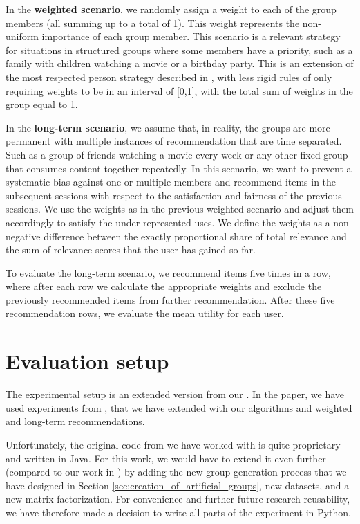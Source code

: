 In the \textbf{weighted scenario}, we randomly assign a weight to each of the group members (all summing up to a total of 1). This weight represents the non-uniform importance of each group member. This scenario is a relevant strategy for situations in structured groups where some members have a priority, such as a family with children watching a movie or a birthday party. This is an extension of the most respected person strategy described in \cite{most_respected_person}, with less rigid rules of only requiring weights to be in an interval of [0,1], with the total sum of weights in the group equal to 1.

In the \textbf{long-term scenario}, we assume that, in reality, the groups are more permanent with multiple instances of recommendation that are time separated. Such as a group of friends watching a movie every week or any other fixed group that consumes content together repeatedly. In this scenario, we want to prevent a systematic bias against one or multiple members and recommend items in the subsequent sessions with respect to the satisfaction and fairness of the previous sessions. We use the weights as in the previous weighted scenario and adjust them accordingly to satisfy the under-represented uses. We define the weights as a non-negative difference between the exactly proportional share of total relevance and the sum of relevance scores that the user has gained so far.

To evaluate the long-term scenario, we recommend items five times in a row, where after each row we calculate the appropriate weights and exclude the previously recommended items from further recommendation. After these five recommendation rows, we evaluate the mean utility for each user.


\section{Evaluation setup} \label{sec:07_experiments.evaluation_setup}
The experimental setup is an extended version from our \cite{our_ep_fuzz_da}. In the paper, we have used experiments from \cite{GFAR-kaya2020}, that we have extended with our algorithms and weighted and long-term recommendations.

Unfortunately, the original code from \cite{GFAR-kaya2020} we have worked with is quite proprietary and written in Java. For this work, we would have to extend it even further (compared to our work in \cite{our_ep_fuzz_da}) by adding the new group generation process that we have designed in Section \ref{sec:creation_of_artificial_groups}, new datasets, and a new matrix factorization. For convenience and further future research reusability, we have therefore made a decision to write all parts of the experiment in Python.

